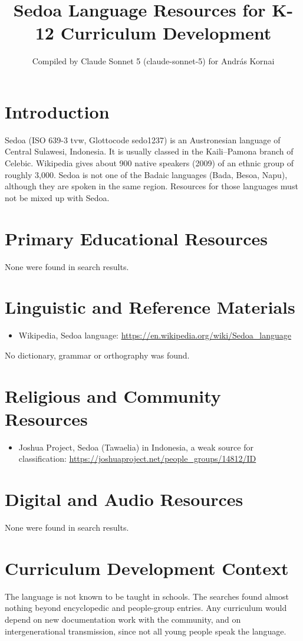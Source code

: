 \documentclass[12pt]{article}
\title{Sedoa Language Resources for K-12 Curriculum Development}
\author{Compiled by Claude Sonnet 5 (claude-sonnet-5) for Andr\'as Kornai}
\date{}
\begin{document}
\maketitle

\section{Introduction}
Sedoa (ISO 639-3 tvw, Glottocode sedo1237) is an Austronesian language of Central Sulawesi, Indonesia. It is usually classed in the Kaili--Pamona branch of Celebic. Wikipedia gives about 900 native speakers (2009) of an ethnic group of roughly 3,000. Sedoa is not one of the Badaic languages (Bada, Besoa, Napu), although they are spoken in the same region. Resources for those languages must not be mixed up with Sedoa.

\section{Primary Educational Resources}
None were found in search results.

\section{Linguistic and Reference Materials}
\begin{itemize}
\item Wikipedia, Sedoa language: \url{https://en.wikipedia.org/wiki/Sedoa_language}
\end{itemize}
No dictionary, grammar or orthography was found.

\section{Religious and Community Resources}
\begin{itemize}
\item Joshua Project, Sedoa (Tawaelia) in Indonesia, a weak source for classification: \url{https://joshuaproject.net/people_groups/14812/ID}
\end{itemize}

\section{Digital and Audio Resources}
None were found in search results.

\section{Curriculum Development Context}
The language is not known to be taught in schools. The searches found almost nothing beyond encyclopedic and people-group entries. Any curriculum would depend on new documentation work with the community, and on intergenerational transmission, since not all young people speak the language.
\end{document}
